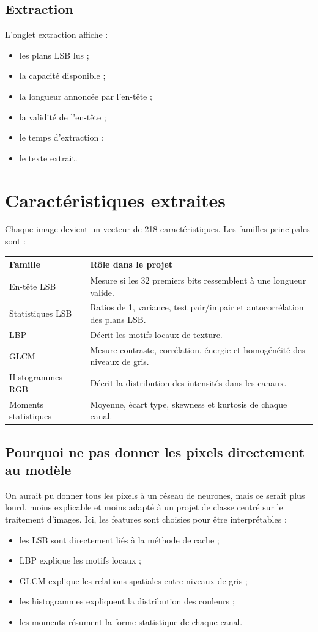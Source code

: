 \documentclass[11pt,a4paper]{article}
\begin{document}
\subsection{Extraction}
L'onglet extraction affiche :
\begin{itemize}
  \item les plans LSB lus ;
  \item la capacité disponible ;
  \item la longueur annoncée par l'en-tête ;
  \item la validité de l'en-tête ;
  \item le temps d'extraction ;
  \item le texte extrait.
\end{itemize}

\section{Caractéristiques extraites}
Chaque image devient un vecteur de 218 caractéristiques. Les familles principales sont :

\begin{longtable}{p{4cm}p{10cm}}
\toprule
Famille & Rôle dans le projet \\
\midrule
En-tête LSB & Mesure si les 32 premiers bits ressemblent à une longueur valide. \\
Statistiques LSB & Ratios de 1, variance, test pair/impair et autocorrélation des plans LSB. \\
LBP & Décrit les motifs locaux de texture. \\
GLCM & Mesure contraste, corrélation, énergie et homogénéité des niveaux de gris. \\
Histogrammes RGB & Décrit la distribution des intensités dans les canaux. \\
Moments statistiques & Moyenne, écart type, skewness et kurtosis de chaque canal. \\
\bottomrule
\end{longtable}

\subsection*{Pourquoi ne pas donner les pixels directement au modèle}
On aurait pu donner tous les pixels à un réseau de neurones, mais ce serait plus lourd, moins explicable et moins adapté à un projet de classe centré sur le traitement d'images. Ici, les features sont choisies pour être interprétables :
\begin{itemize}
  \item les LSB sont directement liés à la méthode de cache ;
  \item LBP explique les motifs locaux ;
  \item GLCM explique les relations spatiales entre niveaux de gris ;
  \item les histogrammes expliquent la distribution des couleurs ;
  \item les moments résument la forme statistique de chaque canal.
\end{itemize}
\end{document}
